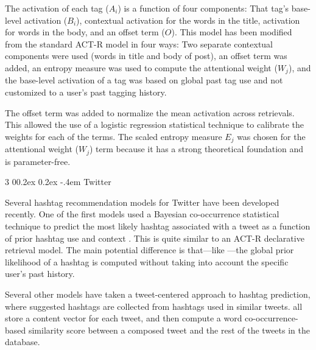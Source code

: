 \documentclass[man,floatsintext,donotrepeattitle]{apa6}
\makeatletter
\renewcommand{\subsubsection}{%
  \@startsection
  {subsubsection}%
  {3}%
  {\parindent}%
  {0\baselineskip \@plus 0.2ex \@minus 0.2ex}%
  {-.4em}%
  {\normalfont\normalsize\bfseries\addperi}}
\makeatother
\begin{document}
The activation of each tag ($A_{i}$) is a function of four components:
That tag's base-level activation ($B_{i}$), contextual activation for the words in the title, activation for words in the body, and an offset term ($O$).
This model has been modified from the standard ACT-R model in four ways:
Two separate contextual components were used (words in title and body of post), an offset term was added, an entropy measure was used to compute the attentional weight ($W_{j}$),
and the base-level activation of a tag was based on global past tag use and not customized to a user's past tagging history.

The offset term was added to normalize the mean activation across retrievals.
This allowed the use of a logistic regression statistical technique to calibrate the weights for each of the terms.
The scaled entropy measure $E_{j}$ was chosen for the attentional weight ($W_{j}$) term because it has a strong theoretical foundation \parencite{Dumais1991} and is parameter-free.

\subsubsection{Twitter}

Several hashtag recommendation models for Twitter have been developed recently.
One of the first models used a Bayesian co-occurrence statistical technique to predict the most likely hashtag associated with a tweet as a function of prior hashtag use and context \parencite{Mazzia2009}.
This is quite similar to an ACT-R declarative retrieval model.
The main potential difference is that---like \textcite{Stanley2013}---the global prior likelihood of a hashtag is computed without taking into account the specific user's past history.

Several other models have taken a tweet-centered approach to hashtag prediction, where suggested hashtags are collected from hashtags used in similar tweets.
\textcites{Li2011, Zangerle2011, Kywe2012} all store a content vector for each tweet, and then compute a word co-occurrence-based similarity score between a composed tweet and the rest of the tweets in the database.
\end{document}
